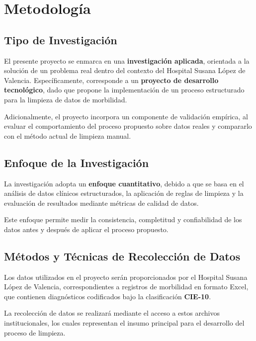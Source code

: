 \documentclass[12pt, letterpaper, oneside]{article}
\begin{document}
\newpage


\section{Metodología}

\subsection{Tipo de Investigación}

El presente proyecto se enmarca en una \textbf{investigación aplicada}, orientada a la solución de un problema real dentro del contexto del Hospital Susana López de Valencia. Específicamente, corresponde a un \textbf{proyecto de desarrollo tecnológico}, dado que propone la implementación de un proceso estructurado para la limpieza de datos de morbilidad.

Adicionalmente, el proyecto incorpora un componente de validación empírica, al evaluar el comportamiento del proceso propuesto sobre datos reales y compararlo con el método actual de limpieza manual.

\subsection{Enfoque de la Investigación}

La investigación adopta un \textbf{enfoque cuantitativo}, debido a que se basa en el análisis de datos clínicos estructurados, la aplicación de reglas de limpieza y la evaluación de resultados mediante métricas de calidad de datos.

Este enfoque permite medir la consistencia, completitud y confiabilidad de los datos antes y después de aplicar el proceso propuesto.

\subsection{Métodos y Técnicas de Recolección de Datos}

Los datos utilizados en el proyecto serán proporcionados por el Hospital Susana López de Valencia, correspondientes a registros de morbilidad en formato Excel, que contienen diagnósticos codificados bajo la clasificación \textbf{CIE-10}.

La recolección de datos se realizará mediante el acceso a estos archivos institucionales, los cuales representan el insumo principal para el desarrollo del proceso de limpieza.
\end{document}
